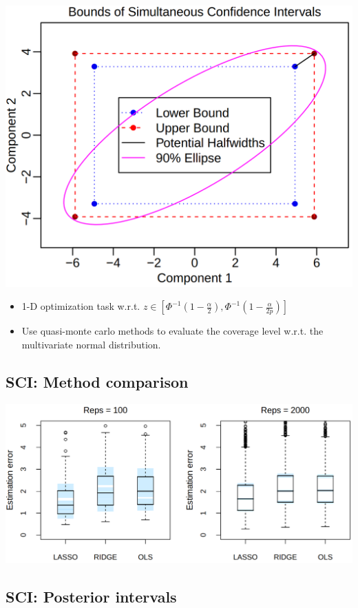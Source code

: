 \documentclass[
  letterpaper,
  DIV=11,
  numbers=noendperiod]{scrartcl}
\begin{document}
\includegraphics{ellipse.png}

\begin{itemize}
\item
  1-D optimization task w.r.t.
  \(z\in \left[\Phi^{-1}\left(1-\frac\alpha 2\right), \Phi^{-1}\left(1-\frac\alpha {2p}\right)\right]\)
\item
  Use quasi-monte carlo methods to evaluate the coverage level w.r.t.
  the multivariate normal distribution.
\end{itemize}

\hypertarget{sci-method-comparison}{%
\subsection{SCI: Method comparison}\label{sci-method-comparison}}

\includegraphics{boxplot.png}

\hypertarget{sci-posterior-intervals}{%
\subsection{SCI: Posterior intervals}\label{sci-posterior-intervals}}
\end{document}
